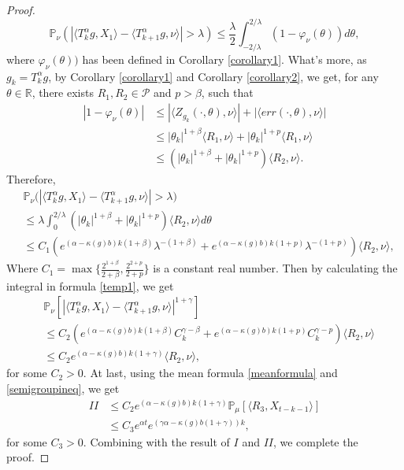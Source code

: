 \documentclass[12pt, a4paper]{amsart}
\theoremstyle{definition}
\numberwithin{equation}{section}
\begin{document}
\begin{proof}
$$\mathbb{P}_{\nu}\left(|\langle T_k^{\alpha}g, X_1\rangle-\langle T_{k+1}^{\alpha}g,\nu\rangle|>\lambda\right)\leq \frac{\lambda}{2}\int_{-2/\lambda}^{2/\lambda}(1-\varphi_{\nu}(\theta))d\theta,$$
where $\varphi_{\nu}(\theta))$ has been defined in Corollary \eqref{corollary1}. What's more, as $g_k=T_k^{\alpha}g$, by Corollary \eqref{corollary1} and Corollary \eqref{corollary2}, we get, for any $\theta\in\mathbb{R}$, there exists $R_1,R_2 \in \mathcal{P}$ and $p>\beta$, such that 
\begin{align*}
    |1-\varphi_{\nu}(\theta)|&\leq|\langle Z_{g_k}(\cdot,\theta),\nu \rangle|+|\langle err(\cdot,\theta),\nu \rangle|\\
    &\leq|\theta_k|^{1+\beta}\langle R_1,\nu\rangle+|\theta_k|^{1+p}\langle R_1, \nu \rangle\\
    &\leq (|\theta_k|^{1+\beta}+|\theta_k|^{1+p})\langle R_2, \nu \rangle.
\end{align*}
Therefore,
\begin{align*}
    &\mathbb{P}_{\nu}\big(|\langle T_k^{\alpha}g, X_1 \rangle-\langle T_{k+1}^{\alpha}g,\nu\rangle|>\lambda\big)\\
    &\leq\lambda\int_0^{2/\lambda}(|\theta_k|^{1+\beta}+|\theta_k|^{1+p})\langle R_2, \nu \rangle d\theta\\
    &\leq C_1(e^{(\alpha-\kappa(g)b)k(1+\beta)}\lambda^{-(1+\beta)}+e^{(\alpha-\kappa(g)b)k(1+p)}\lambda^{-(1+p)})\langle R_2,\nu \rangle,
\end{align*}
Where $C_1=\max\{\frac{2^{1+\beta}}{2+\beta}, \frac{2^{2+p}}{2+p}\}$ is a constant real number. Then by calculating the integral in formula \eqref{temp1}, we get
\begin{align*}
    &\mathbb{P}_{\nu}\left[|\langle T_k^{\alpha}g, X_1\rangle-\langle T_{k+1}^{\alpha}g,\nu\rangle|^{1+\gamma} \right] \\
    &\leq C_2\left(e^{(\alpha-\kappa(g)b)k(1+\beta)}C_k^{\gamma-\beta}+e^{(\alpha-\kappa(g)b)k(1+p)}C_k^{\gamma-p}\right)\langle R_2,\nu\rangle\\
    &\leq C_2 e^{(\alpha-\kappa(g)b)k(1+\gamma)}\langle R_2,\nu\rangle,
\end{align*}
for some $C_2>0$. At last, using the mean formula \eqref{meanformula} and \eqref{semigroupineq}, we get
\begin{align*}
    II &\leq C_2e^{(\alpha-\kappa(g)b)k(1+\gamma)}\mathbb{P}_{\mu}\left[\langle R_3,X_{t-k-1}\rangle\right]\\
       &\leq C_3e^{\alpha t}e^{(\gamma\alpha-\kappa(g)b(1+\gamma))k},
\end{align*}
for some $C_3>0$. Combining with the result of $I$ and $II$, we complete the proof.
\end{proof}
\end{document}
